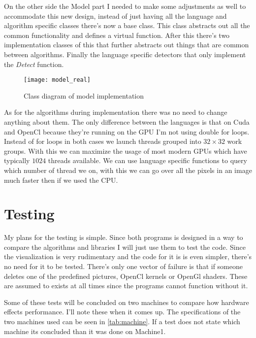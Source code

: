 On the other side the Model part I needed to make some adjustments as well to accommodate this new design, instead of just having all the language and algorithm specific classes there's now a base class. This class abstracts out all the common functionality and defines a virtual function. After this there's two implementation classes of this that further abstracts out things that are common between algorithms. Finally the language specific detectors that only implement the \textit{Detect} function.

\begin{figure}[H]
\centering
\texttt{[image: model\_real]}
\caption{Class diagram of model implementation}
\label{fig:class_model_real}
\end{figure}

As for the algorithms during implementation there was no need to change anything about them. The only difference between the languages is that on Cuda and OpenCl because they're running on the \ac{GPU} I'm not using double for loops. Instead of for loops in both cases we launch threads grouped into $32 \times 32$ work groups. With this we can maximize the usage of most modern \ac{GPU}s which have typically $1024$ threads available. We can use language specific functions to query which number of thread we on, with this we can go over all the pixels in an image much faster then if we used the \ac{CPU}. 


\section{Testing}
\label{chap:dev_testing}

My plans for the testing is simple. Since both programs is designed in a way to compare the algorithms and libraries I will just use them to test the code. Since the visualization is very rudimentary and the code for it is is even simpler, there's no need for it to be tested. There's only one vector of failure is that if someone deletes one of the predefined pictures, OpenCl kernels or OpenGl shaders. These are assumed to exists at all times since the programs cannot function without it.

Some of these tests will be concluded on two machines to compare how hardware effects performance. I'll note these when it comes up. The specifications of the two machines used can be seen in \autoref{tab:machine}. If a test does not state which machine its concluded than it was done on Machine1.

